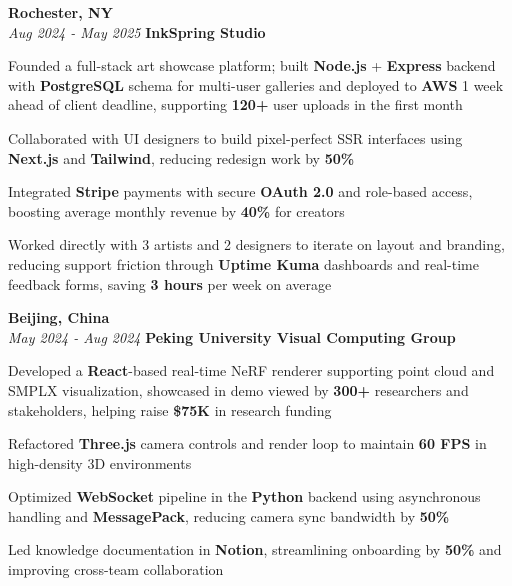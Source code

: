 \begin{twocolentry}{
    \textbf{Rochester, NY} \\
    \textit{Aug 2024 - May 2025}
}{
    \textbf{InkSpring Studio} \\
}
\end{twocolentry}
\begin{onecolentry}
    \begin{highlights}
        \item Founded a full-stack art showcase platform; built \textbf{Node.js} + \textbf{Express} backend with \textbf{PostgreSQL} schema for multi-user galleries and deployed to \textbf{AWS} 1 week ahead of client deadline, supporting \textbf{120+} user uploads in the first month
        \item Collaborated with UI designers to build pixel-perfect SSR interfaces using \textbf{Next.js} and \textbf{Tailwind}, reducing redesign work by \textbf{50\%}
        \item Integrated \textbf{Stripe} payments with secure \textbf{OAuth 2.0} and role-based access, boosting average monthly revenue by \textbf{40\%} for creators
        \item Worked directly with 3 artists and 2 designers to iterate on layout and branding, reducing support friction through \textbf{Uptime Kuma} dashboards and real-time feedback forms, saving \textbf{3 hours} per week on average
    \end{highlights}
\end{onecolentry}

\vspace{0.2cm}

\begin{twocolentry}{
    \textbf{Beijing, China} \\
    \textit{May 2024 - Aug 2024}
}{
    \textbf{Peking University Visual Computing Group} \\
}
\end{twocolentry}
\begin{onecolentry}
    \begin{highlights}
        \item Developed a \textbf{React}-based real-time NeRF renderer supporting point cloud and SMPLX visualization, showcased in demo viewed by \textbf{300+} researchers and stakeholders, helping raise \textbf{\$75K} in research funding
        \item Refactored \textbf{Three.js} camera controls and render loop to maintain \textbf{60 FPS} in high-density 3D environments
        \item Optimized \textbf{WebSocket} pipeline in the \textbf{Python} backend using asynchronous handling and \textbf{MessagePack}, reducing camera sync bandwidth by \textbf{50\%}
        \item Led knowledge documentation in \textbf{Notion}, streamlining onboarding by \textbf{50\%} and improving cross-team collaboration
    \end{highlights}
\end{onecolentry}
